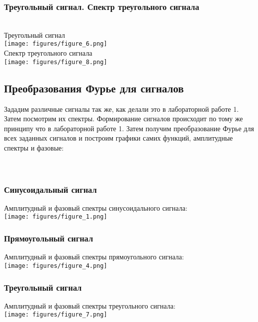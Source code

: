\documentclass[a4paper]{article}
\begin{document}
\subsubsection{Треугольный сигнал. Спектр треугольного сигнала}
\\
Треугольный сигнал\\
\texttt{[image: figures/figure\_6.png]}\\
Спектр треугольного сигнала\\
\texttt{[image: figures/figure\_8.png]}
\subsection{Преобразования Фурье для сигналов}
Зададим различные сигналы так же, как делали это в лабораторной работе 1. Затем посмотрим их спектры.
Формирование сигналов происходит по тому же принципу что в лабораторной работе 1.
Затем получим преобразование Фурье для всех заданных сигналов и построим графики самих функций, амплитудные спектры и фазовые:\\
\newpage
\\
\\
\subsubsection{Синусоидальный сигнал}
Амплитудный и фазовый спектры синусоидального сигнала:\\
\texttt{[image: figures/figure\_1.png]}
\subsubsection{Прямоугольный сигнал}
Амплитудный и фазовый спектры прямоугольного сигнала:\\
\texttt{[image: figures/figure\_4.png]}\\
\subsubsection{Треугольный сигнал}
Амплитудный и фазовый спектры треугольного сигнала:\\
\texttt{[image: figures/figure\_7.png]}\\
\end{document}
